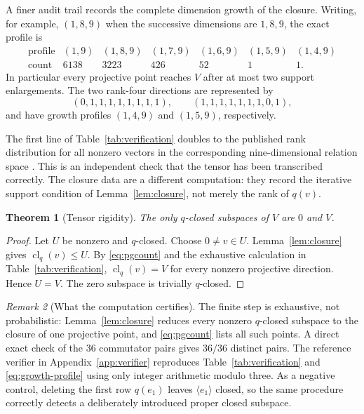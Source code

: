 \documentclass[11pt]{amsart}
\newtheorem{theorem}{Theorem}[section]
\theoremstyle{definition}
\theoremstyle{remark}
\newtheorem{remark}[theorem]{Remark}
\newcommand{\clq}{\operatorname{cl}_q}
\begin{document}
A finer audit trail records the complete dimension growth of the closure.
Writing, for example, $(1,8,9)$ when the successive dimensions are
$1,8,9$, the exact profile is
\begin{equation}\label{eq:growth-profile}
\begin{array}{c|rrrrrr}
\text{profile}&(1,9)&(1,8,9)&(1,7,9)&(1,6,9)&(1,5,9)&(1,4,9)\\
\hline
\text{count}&6138&3223&426&52&1&1.
\end{array}
\end{equation}
In particular every projective point reaches $V$ after at most two support
enlargements.  The two rank-four directions are represented by
\begin{equation}\label{eq:rank4-points}
 (0,1,1,1,1,1,1,1,1),\qquad
 (1,1,1,1,1,1,1,0,1),
\end{equation}
and have growth profiles $(1,4,9)$ and $(1,5,9)$, respectively.

The first line of Table~\ref{tab:verification} doubles to the published
rank distribution for all nonzero vectors in the corresponding
nine-dimensional relation space \cite[p.~5]{AFLObrien10}.  This is an
independent check that the tensor has been transcribed correctly.  The
closure data are a different computation: they record the iterative
support condition of Lemma~\ref{lem:closure}, not merely the rank of
$q(v)$.

\begin{theorem}[Tensor rigidity]\label{thm:rigidity}
The only $q$-closed subspaces of $V$ are $0$ and $V$.
\end{theorem}

\begin{proof}
Let $U$ be nonzero and $q$-closed.  Choose $0\neq v\in U$.
Lemma~\ref{lem:closure} gives $\clq(v)\leq U$.  By
\eqref{eq:pgcount} and the exhaustive calculation in
Table~\ref{tab:verification}, $\clq(v)=V$ for every nonzero projective
direction.  Hence $U=V$.  The zero subspace is trivially $q$-closed.
\end{proof}

\begin{remark}[What the computation certifies]\label{rem:certificate}
The finite step is exhaustive, not probabilistic: Lemma~\ref{lem:closure}
reduces every nonzero $q$-closed subspace to the closure of one projective
point, and \eqref{eq:pgcount} lists all such points.  A direct exact check
of the $36$ commutator pairs gives $36/36$ distinct pairs.  The reference
verifier in Appendix~\ref{app:verifier} reproduces
Table~\ref{tab:verification} and \eqref{eq:growth-profile} using only
integer arithmetic modulo three.  As a negative control, deleting the
first row $q(e_1)$ leaves $\langle e_1\rangle$ closed, so the same
procedure correctly detects a deliberately introduced proper closed
subspace.
\end{remark}
\end{document}
